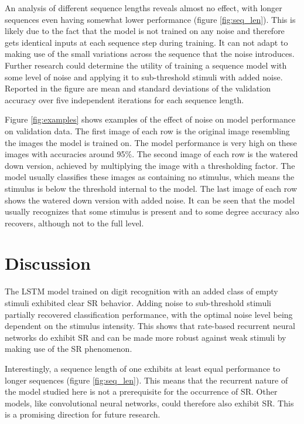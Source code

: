 \documentclass{article}
\begin{document}
An analysis of different sequence lengths reveals almost no effect, with longer sequences even having somewhat lower performance (figure \ref{fig:seq_len}). This is likely due to the fact that the model is not trained on any noise and therefore gets identical inputs at each sequence step during training. It can not adapt to making use of the small variations across the sequence that the noise introduces. Further research could determine the utility of training a sequence model with some level of noise and applying it to sub-threshold stimuli with added noise. Reported in the figure are mean and standard deviations of the validation accuracy over five independent iterations for each sequence length.

Figure \ref{fig:examples} shows examples of the effect of noise on model performance on validation data. The first image of each row is the original image resembling the images the model is trained on. The model performance is very high on these images with accuracies around 95\%. The second image of each row is the watered down version, achieved by multiplying the image with a thresholding factor. The model usually classifies these images as containing no stimulus, which means the stimulus is below the threshold internal to the model. The last image of each row shows the watered down version with added noise. It can be seen that the model usually recognizes that some stimulus is present and to some degree accuracy also recovers, although not to the full level.



\section{Discussion}
The LSTM model trained on digit recognition with an added class of empty stimuli exhibited clear SR behavior. Adding noise to sub-threshold stimuli partially recovered classification performance, with the optimal noise level being dependent on the stimulus intensity. This shows that rate-based recurrent neural networks do exhibit SR and can be made more robust against weak stimuli by making use of the SR phenomenon.

Interestingly, a sequence length of one exhibits at least equal performance to longer sequences (figure \ref{fig:seq_len}). This means that the recurrent nature of the model studied here is not a prerequisite for the occurrence of SR. Other models, like convolutional neural networks, could therefore also exhibit SR. This is a promising direction for future research.
\end{document}

